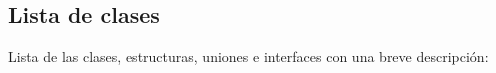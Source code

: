 \subsection{Lista de clases}
Lista de las clases, estructuras, uniones e interfaces con una breve descripción\+:\begin{DoxyCompactList}
\item{}
\end{DoxyCompactList}
